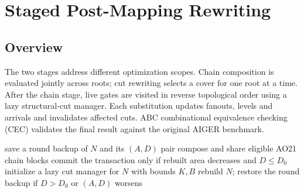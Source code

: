 \section{Staged Post-Mapping Rewriting}

\subsection{Overview}
The two stages address different optimization scopes. Chain composition is evaluated jointly across roots; cut rewriting selects a cover for one root at a time. After the chain stage, live gates are visited in reverse topological order using a lazy structural-cut manager. Each substitution updates fanouts, levels and arrivals and invalidates affected cuts. ABC combinational equivalence checking (CEC) validates the final result against the original AIGER benchmark.



\begin{algorithm}[t]
  \footnotesize
  \caption{A round of ePMapping.}\label{alg_epmapping}
  save a round backup of $N$ and its $(A,D)$ pair\;
  compose and share eligible AO21 chain blocks\;
  commit the transaction only if rebuilt area decreases and $D\le D_0$\;
  initialize a lazy cut manager for $N$ with bounds $K,B$\;
  rebuild $N$; restore the round backup if $D>D_0$ or $(A,D)$ worsens\;
\end{algorithm}


